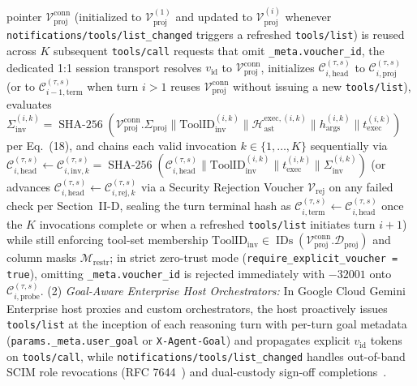\documentclass[conference,10pt]{IEEEtran}
\begin{document}
pointer $\mathcal{V}_{\text{proj}}^{\text{conn}}$ (initialized to $\mathcal{V}_{\text{proj}}^{(1)}$ and updated to $\mathcal{V}_{\text{proj}}^{(i)}$ whenever \texttt{notifications/tools/list\_changed} triggers a refreshed \texttt{tools/list}) is reused across $K$ subsequent \texttt{tools/call} requests that omit \texttt{\_meta.voucher\_id}, the dedicated 1:1 session transport resolves $v_{\text{id}}$ to $\mathcal{V}_{\text{proj}}^{\text{conn}}$, initializes $\mathcal{C}_{i,\text{head}}^{(\tau,s)}$ to $\mathcal{C}_{i,\text{proj}}^{(\tau,s)}$ (or to $\mathcal{C}_{i-1,\text{term}}^{(\tau,s)}$ when turn $i > 1$ reuses $\mathcal{V}_{\text{proj}}^{\text{conn}}$ without issuing a new \texttt{tools/list}), evaluates $\Sigma_{\text{inv}}^{(i,k)} = \operatorname{SHA-256}(\mathcal{V}_{\text{proj}}^{\text{conn}}.\Sigma_{\text{proj}} \parallel \text{ToolID}_{\text{inv}}^{(i,k)} \parallel \mathcal{H}_{\text{ast}}^{\text{exec},(i,k)} \parallel h_{\text{args}}^{(i,k)} \parallel t_{\text{exec}}^{(i,k)})$ per Eq.~(18), and chains each valid invocation $k \in \{1, \dots, K\}$ sequentially via $\mathcal{C}_{i,\text{head}}^{(\tau,s)} \leftarrow \mathcal{C}_{i,\text{inv},k}^{(\tau,s)} = \operatorname{SHA-256}(\mathcal{C}_{i,\text{head}}^{(\tau,s)} \parallel \text{ToolID}_{\text{inv}}^{(i,k)} \parallel t_{\text{exec}}^{(i,k)} \parallel \Sigma_{\text{inv}}^{(i,k)})$ (or advances $\mathcal{C}_{i,\text{head}}^{(\tau,s)} \leftarrow \mathcal{C}_{i,\text{rej},k}^{(\tau,s)}$ via a Security Rejection Voucher $\mathcal{V}_{\text{rej}}$ on any failed check per Section~II-D, sealing the turn terminal hash as $\mathcal{C}_{i,\text{term}}^{(\tau,s)} \leftarrow \mathcal{C}_{i,\text{head}}^{(\tau,s)}$ once the $K$ invocations complete or when a refreshed \texttt{tools/list} initiates turn $i+1$) while still enforcing tool-set membership $\text{ToolID}_{\text{inv}} \in \operatorname{IDs}(\mathcal{V}_{\text{proj}}^{\text{conn}}.\mathcal{D}_{\text{proj}})$ and column masks $\mathcal{M}_{\text{restr}}$; in strict zero-trust mode (\texttt{require\_explicit\_voucher = true}), omitting \texttt{\_meta.voucher\_id} is rejected immediately with $-32001$ onto $\mathcal{C}_{i,\text{probe}}^{(\tau,s)}$. (2) \emph{Goal-Aware Enterprise Host Orchestrators:} In Google Cloud Gemini Enterprise host proxies and custom orchestrators, the host proactively issues \texttt{tools/list} at the inception of each reasoning turn with per-turn goal metadata (\texttt{params.\_meta.user\_goal} or \texttt{X-Agent-Goal}) and propagates explicit $v_{\text{id}}$ tokens on \texttt{tools/call}, while \texttt{notifications/tools/list\_changed} handles out-of-band SCIM role revocations (RFC 7644~\cite{hunt2015rfc7644}) and dual-custody sign-off completions~\cite{anthropic2024mcp}.
\end{document}
